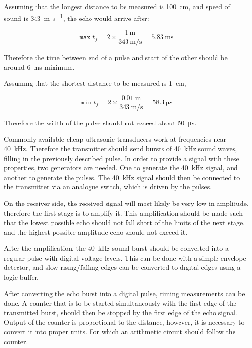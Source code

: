 \documentclass[12pt, a4paper]{article}
\begin{document}
        Assuming that the longest distance to be measured is \SI{100}{\centi\metre}, and speed of sound is \SI{343}{\metre\per\second}, the echo would arrive after:

        \begin{equation}
            \texttt{max }t_f = 2 \times \frac{\SI{1}{\metre}}{\SI{343}{\metre\per\second}} = \SI{5.83}{\milli\second}
        \end{equation}

        \noindent Therefore the time between end of a pulse and start of the other should be around \SI{6}{\milli\second} minimum. 

        \noindent Assuming that the shortest distance to be measured is \SI{1}{\centi\metre}, 

        \begin{equation}
            \texttt{min }t_f = 2 \times \frac{\SI{0.01}{\metre}}{\SI{343}{\metre\per\second}} = \SI{58.3}{\micro\second}
        \end{equation}

        \noindent Therefore the width of the pulse should not exceed about \SI{50}{\micro\second}.


        \bigskip
        Commonly available cheap ultrasonic transducers work at frequencies near \SI{40}{\kilo\hertz}. Therefore the transmitter should send bursts of \SI{40}{\kilo\hertz} sound waves, filling in the previously described pulse. In order to provide a signal with these properties, two generators are needed. One to generate the \SI{40}{\kilo\hertz} signal, and another to generate the pulses. The \SI{40}{\kilo\hertz} signal should then be connected to the transmitter via an analogue switch, which is driven by the pulses.

        \bigskip
        On the receiver side, the received signal will most likely be very low in amplitude, therefore the first stage is to amplify it. This amplification should be made such that the lowest possible echo should not fall short of the limits of the next stage, and the highest possible amplitude echo should not exceed it.
        
        \bigskip
        After the amplification, the \SI{40}{\kilo\hertz} sound burst should be converted into a regular pulse with digital voltage levels. This can be done with a simple envelope detector, and slow rising/falling edges can be converted to digital edges using a logic buffer. 

        \bigskip
        After converting the echo burst into a digital pulse, timing measurements can be done. A counter that is to be started simultaneously with the first edge of the transmitted burst, should then be stopped by the first edge of the echo signal. Output of the counter is proportional to the distance, however, it is necessary to convert it into proper units. For which an arithmetic circuit should follow the counter.
\end{document}
